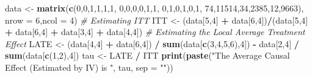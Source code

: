 \documentclass[]{article}
\newenvironment{Shaded}{\begin{snugshade}}{\end{snugshade}}
\newcommand{\KeywordTok}[1]{\textcolor[rgb]{0.13,0.29,0.53}{\textbf{#1}}}
\newcommand{\DataTypeTok}[1]{\textcolor[rgb]{0.13,0.29,0.53}{#1}}
\newcommand{\DecValTok}[1]{\textcolor[rgb]{0.00,0.00,0.81}{#1}}
\newcommand{\StringTok}[1]{\textcolor[rgb]{0.31,0.60,0.02}{#1}}
\newcommand{\CommentTok}[1]{\textcolor[rgb]{0.56,0.35,0.01}{\textit{#1}}}
\newcommand{\OperatorTok}[1]{\textcolor[rgb]{0.81,0.36,0.00}{\textbf{#1}}}
\newcommand{\NormalTok}[1]{#1}
\begin{document}
\begin{Shaded}
\begin{Highlighting}[]
\NormalTok{data <-}\StringTok{ }\KeywordTok{matrix}\NormalTok{(}\KeywordTok{c}\NormalTok{(}\DecValTok{0}\NormalTok{,}\DecValTok{0}\NormalTok{,}\DecValTok{1}\NormalTok{,}\DecValTok{1}\NormalTok{,}\DecValTok{1}\NormalTok{,}\DecValTok{1}\NormalTok{,}
                 \DecValTok{0}\NormalTok{,}\DecValTok{0}\NormalTok{,}\DecValTok{0}\NormalTok{,}\DecValTok{0}\NormalTok{,}\DecValTok{1}\NormalTok{,}\DecValTok{1}\NormalTok{,}
                 \DecValTok{0}\NormalTok{,}\DecValTok{1}\NormalTok{,}\DecValTok{0}\NormalTok{,}\DecValTok{1}\NormalTok{,}\DecValTok{0}\NormalTok{,}\DecValTok{1}\NormalTok{,}
                 \DecValTok{74}\NormalTok{,}\DecValTok{11514}\NormalTok{,}\DecValTok{34}\NormalTok{,}\DecValTok{2385}\NormalTok{,}\DecValTok{12}\NormalTok{,}\DecValTok{9663}\NormalTok{), }\DataTypeTok{nrow =} \DecValTok{6}\NormalTok{,}\DataTypeTok{ncol =} \DecValTok{4}\NormalTok{)}
\CommentTok{# Estimating ITT}
\NormalTok{ITT <-}\StringTok{ }\NormalTok{(data[}\DecValTok{5}\NormalTok{,}\DecValTok{4}\NormalTok{] }\OperatorTok{+}\StringTok{ }\NormalTok{data[}\DecValTok{6}\NormalTok{,}\DecValTok{4}\NormalTok{])}\OperatorTok{/}\NormalTok{(data[}\DecValTok{5}\NormalTok{,}\DecValTok{4}\NormalTok{] }\OperatorTok{+}\StringTok{ }\NormalTok{data[}\DecValTok{6}\NormalTok{,}\DecValTok{4}\NormalTok{] }\OperatorTok{+}\StringTok{ }\NormalTok{data[}\DecValTok{3}\NormalTok{,}\DecValTok{4}\NormalTok{] }\OperatorTok{+}\StringTok{ }\NormalTok{data[}\DecValTok{4}\NormalTok{,}\DecValTok{4}\NormalTok{])}
\CommentTok{# Estimating the Local Average Treatment Effect}
\NormalTok{LATE <-}\StringTok{ }\NormalTok{(data[}\DecValTok{4}\NormalTok{,}\DecValTok{4}\NormalTok{] }\OperatorTok{+}\StringTok{ }\NormalTok{data[}\DecValTok{6}\NormalTok{,}\DecValTok{4}\NormalTok{]) }\OperatorTok{/}\StringTok{ }\KeywordTok{sum}\NormalTok{(data[}\KeywordTok{c}\NormalTok{(}\DecValTok{3}\NormalTok{,}\DecValTok{4}\NormalTok{,}\DecValTok{5}\NormalTok{,}\DecValTok{6}\NormalTok{),}\DecValTok{4}\NormalTok{]) }\OperatorTok{-}\StringTok{ }\NormalTok{data[}\DecValTok{2}\NormalTok{,}\DecValTok{4}\NormalTok{] }\OperatorTok{/}\StringTok{ }\KeywordTok{sum}\NormalTok{(data[}\KeywordTok{c}\NormalTok{(}\DecValTok{1}\NormalTok{,}\DecValTok{2}\NormalTok{),}\DecValTok{4}\NormalTok{])}
\NormalTok{tau <-}\StringTok{ }\NormalTok{LATE }\OperatorTok{/}\StringTok{ }\NormalTok{ITT}
\KeywordTok{print}\NormalTok{(}\KeywordTok{paste}\NormalTok{(}\StringTok{"The Average Causal Effect (Estimated by IV) is "}\NormalTok{, tau, }\DataTypeTok{sep =} \StringTok{""}\NormalTok{))}
\end{Highlighting}
\end{Shaded}
\end{document}

